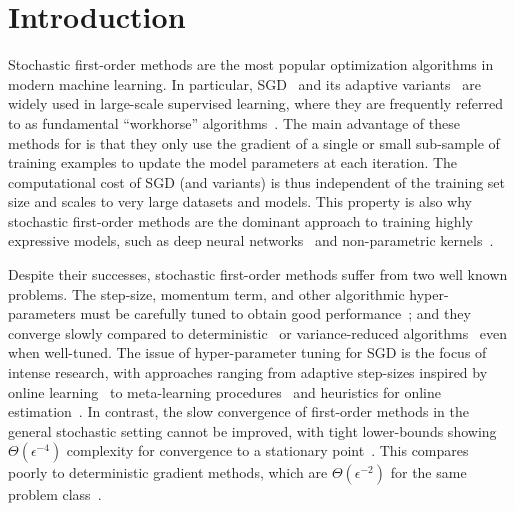 
\chapter{Introduction}\label{ch:Introduction}

Stochastic first-order methods are the most popular optimization algorithms in modern machine learning.
In particular, \ac{SGD}~\citep{robbins1951sgd} and its adaptive variants~\citep{duchi2011adagrad, tieleman2012rmsprop, zeiler2012adadelta, kingma2015adam} are widely used in large-scale supervised learning, where they are frequently referred to as fundamental ``workhorse'' algorithms~\citep{qian2019improvedrates, assran2019sgpush, grosse2015scaling}. 
The main advantage of these methods for  is that they only use the gradient of a single or small sub-sample of training examples to update the model parameters at each iteration.
The computational cost of \ac{SGD} (and variants) is thus independent of the training set size and scales to very large datasets and models.
This property is also why stochastic first-order methods are the dominant approach to training highly expressive models, such as deep neural networks~\citep{zhang2017understanding, bengio2012practical} and non-parametric kernels~\citep{liang2018just, belkin2019datainterp}.

Despite their successes, stochastic first-order methods suffer from two well known problems. 
The step-size, momentum term, and other algorithmic hyper-parameters must be carefully tuned to obtain good performance~\citep{bengio2012practical, schaul2013no, li2019convergence, choi2019empirical}; and
they converge slowly compared to deterministic~\citep{nesterov2004lectures} or variance-reduced algorithms~\citep{leroux2012sag, johnson2013svrg, defazio2014saga} even when well-tuned.
The issue of hyper-parameter tuning for \ac{SGD} is the focus of intense research, with approaches ranging from adaptive step-sizes inspired by online learning~\citep{luo2019adabound, li2019convergence, orabona2017coin} to meta-learning procedures~\citep{baydin2018hypergradient, schraudolph1999local, sutton1992gain, almeida1998parameter, plagianakos2001learning, shao2000rates} and heuristics for online estimation~\citep{schaul2013no, rolinek2018l4, tan2016bb}.
In contrast, the slow convergence of first-order methods in the general stochastic setting cannot be improved, with tight lower-bounds showing \( \Theta(\epsilon^{-4}) \) complexity for convergence to a stationary point~\citep{drori2019complexity, arjevani2019lower}.
This compares poorly to deterministic gradient methods, which are \( \Theta(\epsilon^{-2}) \) for the same problem class~\citep{carmon2019lower}.


